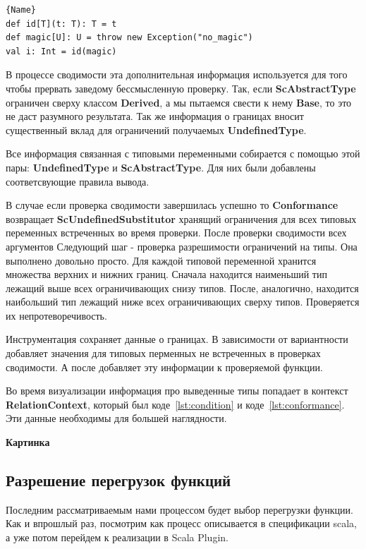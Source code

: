 \begin{lstlisting}[caption={Пример ScAbstractType},label=lst:abstract]{Name}
def id[T](t: T): T = t
def magic[U]: U = throw new Exception("no_magic")
val i: Int = id(magic)
\end{lstlisting}

В процессе сводимости эта дополнительная информация используется для
того чтобы прервать заведому бессмысленную проверку.
Так, если \textbf{ScAbstractType} ограничен сверху классом \textbf{Derived},
а мы пытаемся свести к нему \textbf{Base}, то это не даст разумного результата.
Так же информация о границах вносит существенный вклад для ограничений
получаемых \textbf{UndefinedType}.

Все информация связанная с типовыми переменными собирается с помощью этой пары:
\textbf{UndefinedType} и \textbf{ScAbstractType}.
Для них были добавлены соответсвующие правила вывода.

В случае если проверка сводимости завершилась успешно то \textbf{Conformance}
возвращает \textbf{ScUndefinedSubstitutor} хранящий ограничения для всех типовых
переменных встреченных во время проверки.
После проверки сводимости всех аргументов
Следующий шаг - проверка разрешимости ограничений на типы.
Она выполнено довольно просто.
Для каждой типовой переменной хранится множества верхних и нижних границ.
Сначала находится наименьший тип лежащий выше всех ограничивающих снизу типов.
После, аналогично, находится наибольший тип лежащий ниже всех ограничивающих
сверху типов.
Проверяется их непротеворечивость.

Инструментация сохраняет данные о границах.
В зависимости от вариантности добавляет значения для типовых перменных не
встреченных в проверках сводимости.
А после добавляет эту информации к проверяемой функции.

Во время визуализации информация про выведенные типы попадает в контекст
\textbf{RelationContext}, который был коде~\ref{lst:condition} и
коде~\ref{lst:conformance}.
Эти данные необходимы для большей наглядности.

\textbf{Картинка}

\subsection{Разрешение перегрузок функций}
\label{sec:overloading}

Последним рассматриваемым нами процессом будет выбор перегрузки функции.
Как и впрошлый раз, посмотрим как процесс описывается в спецификации scala,
а уже потом перейдем к реализации в Scala Plugin.

